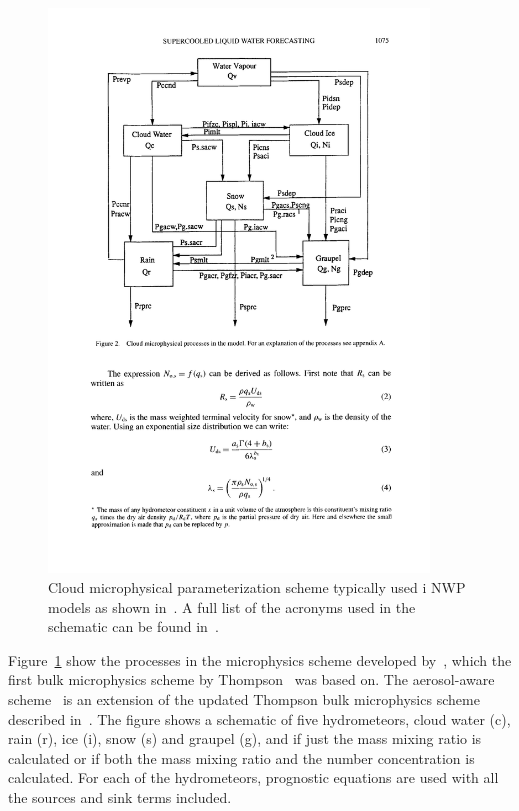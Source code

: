 \begin{figure}[h]
\centering
\includegraphics[width=0.9\textwidth]{model_methods/microphysics.pdf}
\caption{Cloud microphysical parameterization scheme typically used i NWP models as shown in~\citet{Reisner1998}. A full list of the acronyms used in the schematic can be found in~\citet{Reisner1998}.}
\label{fig:microphysics}
\end{figure}

Figure~\ref{fig:microphysics} show the processes in the microphysics scheme developed by~\citet{Reisner1998}, which the first bulk microphysics scheme by Thompson~\citep{Thompson2004} was based on. The aerosol-aware scheme~\citep{Thompson2014} is an extension of the updated Thompson bulk microphysics scheme described in~\citet{Thompson2008}. The figure shows a schematic of five hydrometeors, cloud water (c), rain (r), ice (i), snow (s) and graupel (g), and if just the mass mixing ratio is calculated or if both the mass mixing ratio and the number concentration is calculated. For each of the hydrometeors, prognostic equations are used with all the sources and sink terms included.%
 
